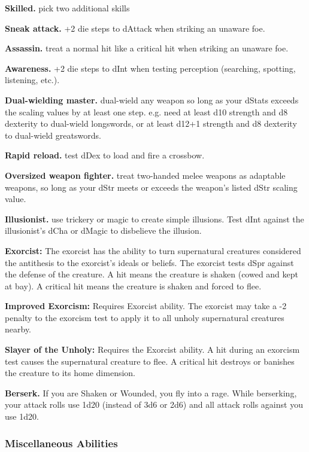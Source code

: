 \documentclass[10pt,twoside,twocolumn,openany]{book}
\begin{document}
\par \textbf{Skilled.} pick two additional skills
\par \textbf{Sneak attack.}  +2 die steps to dAttack when striking an unaware foe.
\par \textbf{Assassin.} treat a normal hit like a critical hit when striking an unaware foe.
\par \textbf{Awareness.} +2 die steps to dInt when testing perception (searching, spotting, listening, etc.).
\par \textbf{Dual-wielding master.} dual-wield any weapon so long as your dStats exceeds the scaling values by at least one step. e.g. need at least d10 strength and d8 dexterity to dual-wield longswords, or at least d12+1 strength and d8 dexterity to dual-wield greatswords.
\par \textbf{Rapid reload.} test dDex to load and fire a crossbow.
\par \textbf{Oversized weapon fighter.} treat two-handed melee weapons as adaptable weapons, so long as your dStr meets or exceeds the weapon's listed dStr scaling value.
\par \textbf{Illusionist.} use trickery or magic to create simple illusions. Test dInt against the illusionist's dCha or dMagic to disbelieve the illusion.
\par \textbf{Exorcist:} The exorcist has the ability to turn supernatural creatures considered the antithesis to the exorcist's ideals or beliefs. The exorcist tests dSpr against the defense of the creature. A hit means the creature is shaken (cowed and kept at bay). A critical hit means the creature is shaken and forced to flee.
\par \textbf{Improved Exorcism:} Requires Exorcist ability. The exorcist may take a -2 penalty to the exorcism test to apply it to all unholy supernatural creatures nearby.
\par \textbf{Slayer of the Unholy:} Requires the Exorcist ability. A hit during an exorcism test causes the supernatural creature to flee. A critical hit destroys or banishes the creature to its home dimension.
\par \textbf{Berserk.} If you are Shaken or Wounded, you fly into a rage. While berserking, your attack rolls use 1d20 (instead of 3d6 or 2d6) and all attack rolls against you use 1d20.

\subsubsection{Miscellaneous Abilities}
\end{document}
